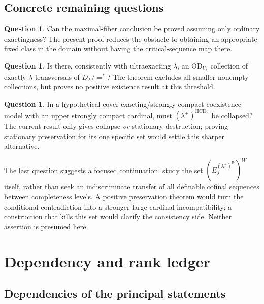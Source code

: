 \documentclass[11pt,letterpaper]{article}
\theoremstyle{definition}
\newtheorem{question}[definition]{Question}
\numberwithin{equation}{section}
\newcommand{\OD}{\mathrm{OD}}
\newcommand{\HCD}{\mathrm{HCD}}
\begin{document}
\subsection{Concrete remaining questions}

\begin{question}
Can the maximal-fiber conclusion be proved assuming only ordinary exactingness? The present proof reduces the obstacle to obtaining an appropriate fixed class in the domain without having the critical-sequence map there.
\end{question}

\begin{question}
Is there, consistently with ultraexacting $\lambda$, an $\OD_{V_\lambda}$ collection of exactly $\lambda$ transversals of $D_\lambda/{=^*}$? The theorem excludes all smaller nonempty collections, but proves no positive existence result at this threshold.
\end{question}

\begin{question}
In a hypothetical cover-exacting/strongly-compact coexistence model with an upper strongly compact cardinal, must $(\lambda^+)^{\HCD_\kappa}$ be collapsed? The current result only gives collapse \emph{or} stationary destruction; proving stationary preservation for its one specific set would settle this sharper alternative.
\end{question}

The last question suggests a focused continuation: study the set $(E^{(\lambda^+)^W}_\lambda)^W$ itself, rather than seek an indiscriminate transfer of all definable cofinal sequences between completeness levels. A positive preservation theorem would turn the conditional contradiction into a stronger large-cardinal incompatibility; a construction that kills this set would clarify the consistency side. Neither assertion is presumed here.

\clearpage
\appendix
\section{Dependency and rank ledger}

\subsection{Dependencies of the principal statements}
\end{document}
